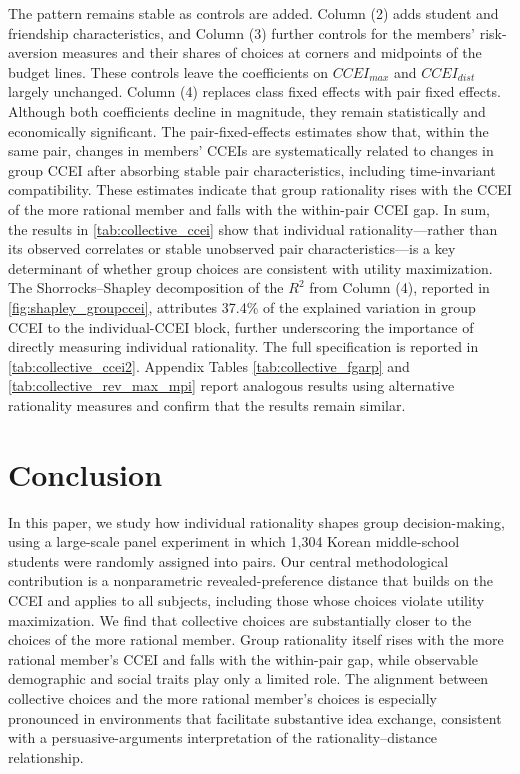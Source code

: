 \documentclass[11 pt]{article}
\begin{document}
The pattern remains stable as controls are added. Column (2) adds student and friendship characteristics, and Column (3) further controls for the members' risk-aversion measures and their shares of choices at corners and midpoints of the budget lines. These controls leave the coefficients on $CCEI_{max}$ and $CCEI_{dist}$ largely unchanged. Column (4) replaces class fixed effects with pair fixed effects. Although both coefficients decline in magnitude, they remain statistically and economically significant. The pair-fixed-effects estimates show that, within the same pair, changes in members' CCEIs are systematically related to changes in group CCEI after absorbing stable pair characteristics, including time-invariant compatibility. These estimates indicate that group rationality rises with the CCEI of the more rational member and falls with the within-pair CCEI gap. In sum, the results in \autoref{tab:collective_ccei} show that individual rationality—rather than its observed correlates or stable unobserved pair characteristics—is a key determinant of whether group choices are consistent with utility maximization. The Shorrocks--Shapley decomposition of the $R^2$ from Column (4), reported in \autoref{fig:shapley_groupccei}, attributes 37.4\% of the explained variation in group CCEI to the individual-CCEI block, further underscoring the importance of directly measuring individual rationality. The full specification is reported in \autoref{tab:collective_ccei2}. Appendix Tables \autoref{tab:collective_fgarp} and \autoref{tab:collective_rev_max_mpi} report analogous results using alternative rationality measures and confirm that the results remain similar.



\section{Conclusion}\label{section:conclusion}

In this paper, we study how individual rationality shapes group decision-making, using a large-scale panel experiment in which 1,304 Korean middle-school students were randomly assigned into pairs. Our central methodological contribution is a nonparametric revealed-preference distance that builds on the CCEI and applies to all subjects, including those whose choices violate utility maximization. We find that collective choices are substantially closer to the choices of the more rational member. Group rationality itself rises with the more rational member's CCEI and falls with the within-pair gap, while observable demographic and social traits play only a limited role. The alignment between collective choices and the more rational member's choices is especially pronounced in environments that facilitate substantive idea exchange, consistent with a persuasive-arguments interpretation of the rationality--distance relationship.
\end{document}
